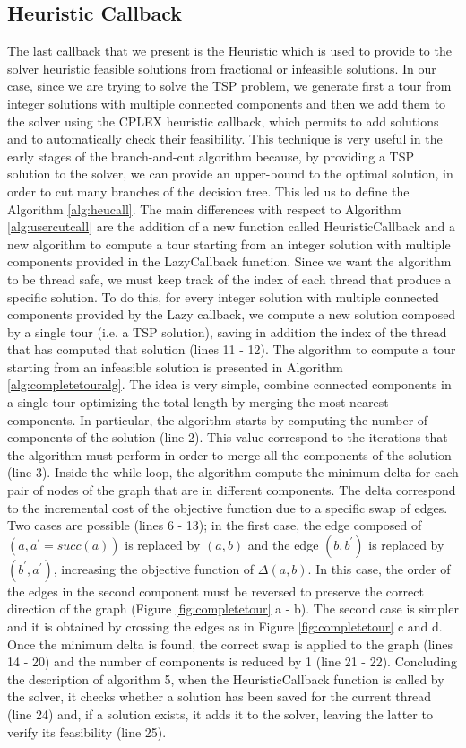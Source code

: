 \subsection{Heuristic Callback}
\label{callHeu}
The last callback that we present is the Heuristic which is used to provide to the solver heuristic feasible solutions from fractional or infeasible solutions. 
In our case, since we are trying to solve the TSP problem, we generate first a tour from integer solutions with multiple connected components and then we add them to the solver using the CPLEX heuristic callback, which permits to add solutions and to automatically check their feasibility. This technique is very useful in the early stages of the branch-and-cut algorithm because, by providing a TSP solution to the solver, we can provide an upper-bound to the optimal solution, in order to cut many branches of the decision tree. This led us to define the Algorithm \ref{alg:heucall}. The main differences with respect to Algorithm \ref{alg:usercutcall} are the addition of a new function called HeuristicCallback and a new algorithm to compute a tour starting from an integer solution with multiple components provided in the LazyCallback function. Since we want the algorithm to be thread safe, we must keep track of the index of each thread that produce a specific solution. To do this, for every integer solution with multiple connected components provided by the Lazy callback, we compute a new solution composed by a single tour (i.e. a TSP solution), saving in addition the index of the thread that has computed that solution (lines 11 - 12).
The algorithm to compute a tour starting from an infeasible solution is presented in Algorithm \ref{alg:completetouralg}. The idea is very simple, combine connected components in a single tour optimizing the total length by merging the most nearest components.
In particular, the algorithm starts by computing the number of components of the solution (line 2). This value correspond to the iterations that the algorithm must perform in order to merge all the components of the solution (line 3). Inside the while loop, the algorithm compute the minimum delta for each pair of nodes of the graph that are in different components. The delta correspond to the incremental cost of the objective function due to a specific swap of edges. Two cases are possible (lines 6 - 13); in the first case, the edge composed of $(a, a^{\prime} = \textit{succ}(a))$ is replaced by $(a, b)$ and the edge $(b, b^{\prime})$ is replaced by $(b^{\prime}, a^{\prime})$, increasing the objective function of $\Delta(a,b)$. In this case, the order of the edges in the second component must be reversed to preserve the correct direction of the graph (Figure \ref{fig:completetour} a - b). The second case is simpler and it is obtained by crossing the edges as in Figure \ref{fig:completetour} c and d. Once the minimum delta is found, the correct swap is applied to the graph (lines 14 - 20) and the number of components is reduced by 1 (line 21 - 22). 
Concluding the description of algorithm 5, when the HeuristicCallback function is called by the solver, it checks whether a solution has been saved for the current thread (line 24) and, if a solution exists, it adds it to the solver, leaving the latter to verify its feasibility (line 25).

